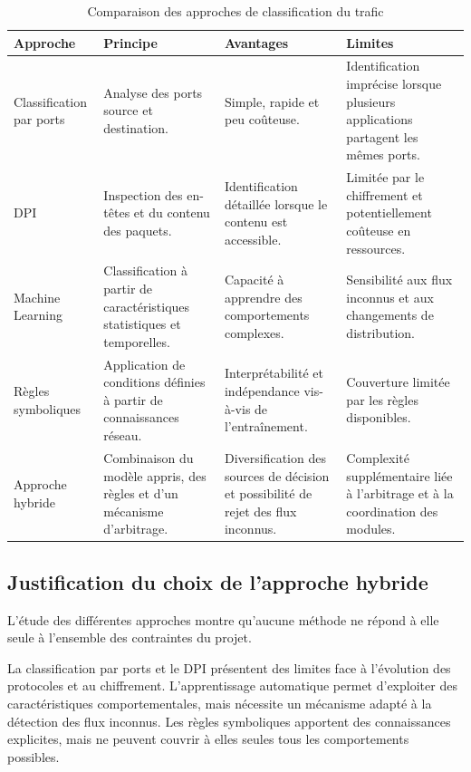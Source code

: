 \begin{table}[H]
\centering
\caption{Comparaison des approches de classification du trafic}
\label{tab:comparaison-approches}

\small
\begin{tabularx}{\textwidth}{|p{2.5cm}|Y|Y|Y|}
\hline
\textbf{Approche} &
\textbf{Principe} &
\textbf{Avantages} &
\textbf{Limites} \\
\hline

Classification par ports &
Analyse des ports source et destination. &
Simple, rapide et peu coûteuse. &
Identification imprécise lorsque plusieurs applications partagent
les mêmes ports. \\
\hline

DPI &
Inspection des en-têtes et du contenu des paquets. &
Identification détaillée lorsque le contenu est accessible. &
Limitée par le chiffrement et potentiellement coûteuse en ressources. \\
\hline

Machine Learning &
Classification à partir de caractéristiques statistiques et temporelles. &
Capacité à apprendre des comportements complexes. &
Sensibilité aux flux inconnus et aux changements de distribution. \\
\hline

Règles symboliques &
Application de conditions définies à partir de connaissances réseau. &
Interprétabilité et indépendance vis-à-vis de l'entraînement. &
Couverture limitée par les règles disponibles. \\
\hline

Approche hybride &
Combinaison du modèle appris, des règles et d'un mécanisme d'arbitrage. &
Diversification des sources de décision et possibilité de rejet des
flux inconnus. &
Complexité supplémentaire liée à l'arbitrage et à la coordination
des modules. \\
\hline

\end{tabularx}
\end{table}

\subsection{Justification du choix de l'approche hybride}

L'étude des différentes approches montre qu'aucune méthode ne répond
à elle seule à l'ensemble des contraintes du projet.

La classification par ports et le DPI présentent des limites
face à l'évolution des protocoles et au chiffrement. L'apprentissage
automatique permet d'exploiter des caractéristiques comportementales,
mais nécessite un mécanisme adapté à la détection des flux inconnus.
Les règles symboliques apportent des connaissances explicites,
mais ne peuvent couvrir à elles seules tous les comportements
possibles.

